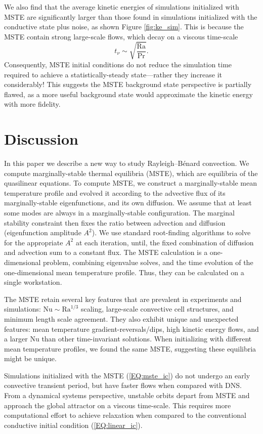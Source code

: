 \documentclass[reprint,amsmath,amssymb,aps]{revtex4-1}
\newcommand\Ra{\mathrm{Ra}}
\newcommand\Nu{\mathrm{Nu}}
\newcommand{\eq}[1]{(\ref{#1})}
\begin{document}
We also find that the average kinetic energies of simulations initialized with MSTE are significantly larger than those found in simulations initialized with the conductive state plus noise, as shown Figure \ref{fig:ke_sim}. 
This is because the MSTE contain strong large-scale flows, which decay on a viscous time-scale
\begin{equation}
    t_{\nu} \sim \sqrt{\frac{\Ra}{\Pr}}. \nonumber
\end{equation}
Consequently, MSTE initial conditions do not reduce the simulation time required to achieve a statistically-steady state---rather they increase it considerably!
This suggests the MSTE background state perspective is partially flawed, as a more useful background state would approximate the kinetic energy with more fidelity.

\section{Discussion}\label{sec:Discussion}
In this paper we describe a new way to study Rayleigh–Bénard convection. 
We compute marginally-stable thermal equilibria (MSTE), which are equilibria of the quasilinear equations.
To compute MSTE, we construct a marginally-stable mean temperature profile and evolved it according to the advective flux of its marginally-stable eigenfunctions, and its own diffusion. 
We assume that at least some modes are always in a marginally-stable configuration. 
The marginal stability constraint then fixes the ratio between advection and diffusion (eigenfunction amplitude $A^2$). 
We use standard root-finding algorithms to solve for the appropriate $A^2$ at each iteration, until, the fixed combination of diffusion and advection sum to a constant flux.
The MSTE calculation is a one-dimensional problem, combining eigenvalue solves, and the time evolution of the one-dimensional mean temperature profile.
Thus, they can be calculated on a single workstation.

The MSTE retain several key features that are prevalent in experiments and simulations: $\Nu \sim\Ra^{1/3}$ scaling, large-scale convective cell structures, and minimum length scale agreement. 
They also exhibit unique and unexpected features: mean temperature gradient-reversals/dips, high kinetic energy flows, and a larger $\Nu$ than other time-invariant solutions. 
When initializing with different mean temperature profiles, we found the same MSTE, suggesting these equilibria might be unique.

Simulations initialized with the MSTE \eq{EQ:mste_ic} do not undergo an early convective transient period, but have faster flows when compared with DNS.
From a dynamical systems perspective, unstable orbits depart from MSTE and approach the global attractor on a viscous time-scale.
This requires more computational effort to achieve relaxation when compared to the conventional conductive initial condition \eq{EQ:linear_ic}.
\end{document}
